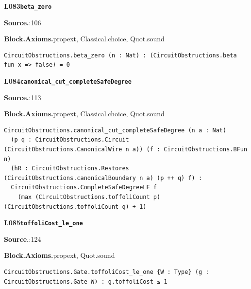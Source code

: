 \par\medskip\noindent\begin{minipage}{\textwidth}
{\small\bfseries L083\enspace\texttt{beta\_zero}\par}
{\footnotesize\raggedright\textbf{Source.}\enspace{}:106\par
\textbf{Block.}\quad\textbf{Axioms.}\enspace propext, Classical.choice, Quot.sound\par}\nopagebreak
\begin{lstlisting}
CircuitObstructions.beta_zero (n : Nat) : (CircuitObstructions.beta fun x => false) = 0
\end{lstlisting}
\end{minipage}\par

\par\medskip\noindent\begin{minipage}{\textwidth}
{\small\bfseries L084\enspace\texttt{canonical\_cut\_completeSafeDegree}\par}
{\footnotesize\raggedright\textbf{Source.}\enspace{}:113\par
\textbf{Block.}\quad\textbf{Axioms.}\enspace propext, Classical.choice, Quot.sound\par}\nopagebreak
\begin{lstlisting}
CircuitObstructions.canonical_cut_completeSafeDegree (n a : Nat)
  (p q : CircuitObstructions.Circuit (CircuitObstructions.CanonicalWire n a)) (f : CircuitObstructions.BFun n)
  (hR : CircuitObstructions.Restores (CircuitObstructions.canonicalBoundary n a) (p ++ q) f) :
  CircuitObstructions.CompleteSafeDegreeLE f
    (max (CircuitObstructions.toffoliCount p) (CircuitObstructions.toffoliCount q) + 1)
\end{lstlisting}
\end{minipage}\par

\par\medskip\noindent\begin{minipage}{\textwidth}
{\small\bfseries L085\enspace\texttt{toffoliCost\_le\_one}\par}
{\footnotesize\raggedright\textbf{Source.}\enspace{}:124\par
\textbf{Block.}\quad\textbf{Axioms.}\enspace propext, Quot.sound\par}\nopagebreak
\begin{lstlisting}
CircuitObstructions.Gate.toffoliCost_le_one {W : Type} (g : CircuitObstructions.Gate W) : g.toffoliCost ≤ 1
\end{lstlisting}
\end{minipage}\par

